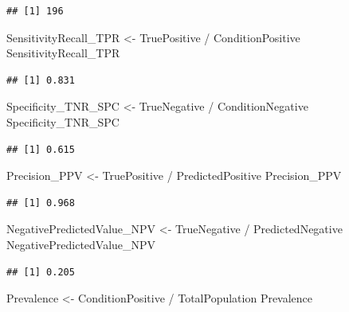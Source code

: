\documentclass[
]{book}
\newenvironment{Shaded}{\begin{snugshade}}{\end{snugshade}}
\newcommand{\NormalTok}[1]{#1}
\newcommand{\OtherTok}[1]{\textcolor[rgb]{0.56,0.35,0.01}{#1}}
\newcommand{\SpecialCharTok}[1]{\textcolor[rgb]{0.00,0.00,0.00}{#1}}
\begin{document}
\begin{verbatim}
## [1] 196
\end{verbatim}

\begin{Shaded}
\begin{Highlighting}[]
\NormalTok{SensitivityRecall\_TPR }\OtherTok{\textless{}{-}}\NormalTok{ TruePositive }\SpecialCharTok{/}\NormalTok{ ConditionPositive}
\NormalTok{SensitivityRecall\_TPR}
\end{Highlighting}
\end{Shaded}

\begin{verbatim}
## [1] 0.831
\end{verbatim}

\begin{Shaded}
\begin{Highlighting}[]
\NormalTok{Specificity\_TNR\_SPC }\OtherTok{\textless{}{-}}\NormalTok{ TrueNegative }\SpecialCharTok{/}\NormalTok{ ConditionNegative}
\NormalTok{Specificity\_TNR\_SPC}
\end{Highlighting}
\end{Shaded}

\begin{verbatim}
## [1] 0.615
\end{verbatim}

\begin{Shaded}
\begin{Highlighting}[]
\NormalTok{Precision\_PPV }\OtherTok{\textless{}{-}}\NormalTok{ TruePositive }\SpecialCharTok{/}\NormalTok{ PredictedPositive}
\NormalTok{Precision\_PPV }
\end{Highlighting}
\end{Shaded}

\begin{verbatim}
## [1] 0.968
\end{verbatim}

\begin{Shaded}
\begin{Highlighting}[]
\NormalTok{NegativePredictedValue\_NPV }\OtherTok{\textless{}{-}}\NormalTok{ TrueNegative }\SpecialCharTok{/}\NormalTok{ PredictedNegative}
\NormalTok{NegativePredictedValue\_NPV}
\end{Highlighting}
\end{Shaded}

\begin{verbatim}
## [1] 0.205
\end{verbatim}

\begin{Shaded}
\begin{Highlighting}[]
\NormalTok{Prevalence }\OtherTok{\textless{}{-}}\NormalTok{ ConditionPositive }\SpecialCharTok{/}\NormalTok{ TotalPopulation}
\NormalTok{Prevalence}
\end{Highlighting}
\end{Shaded}
\end{document}
